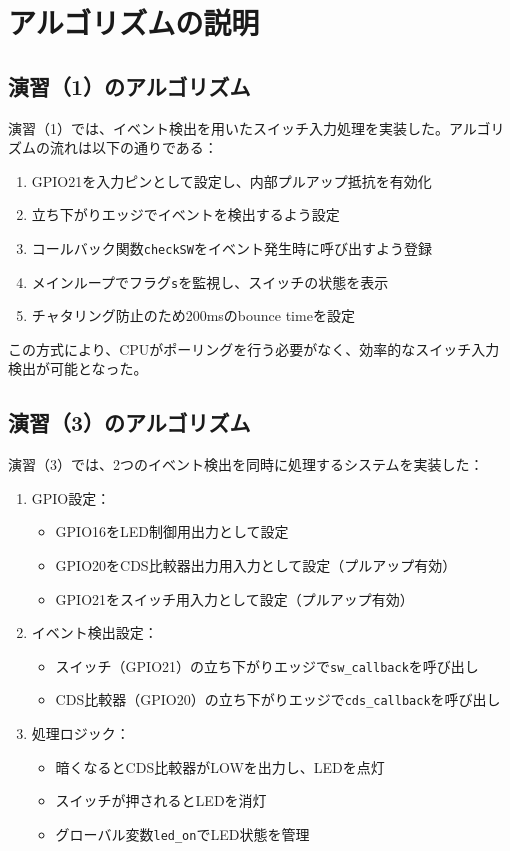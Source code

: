 \documentclass[a4paper,11pt,dvipdfmx]{jsarticle}
\begin{document}
\section{アルゴリズムの説明}
\subsection{演習（1）のアルゴリズム}
演習（1）では、イベント検出を用いたスイッチ入力処理を実装した。アルゴリズムの流れは以下の通りである：

\begin{enumerate}
\item GPIO21を入力ピンとして設定し、内部プルアップ抵抗を有効化
\item 立ち下がりエッジでイベントを検出するよう設定
\item コールバック関数\texttt{checkSW}をイベント発生時に呼び出すよう登録
\item メインループでフラグ\texttt{s}を監視し、スイッチの状態を表示
\item チャタリング防止のため200msのbounce timeを設定
\end{enumerate}

この方式により、CPUがポーリングを行う必要がなく、効率的なスイッチ入力検出が可能となった。

\subsection{演習（3）のアルゴリズム}
演習（3）では、2つのイベント検出を同時に処理するシステムを実装した：

\begin{enumerate}
\item GPIO設定：
   \begin{itemize}
   \item GPIO16をLED制御用出力として設定
   \item GPIO20をCDS比較器出力用入力として設定（プルアップ有効）
   \item GPIO21をスイッチ用入力として設定（プルアップ有効）
   \end{itemize}
\item イベント検出設定：
   \begin{itemize}
   \item スイッチ（GPIO21）の立ち下がりエッジで\texttt{sw\_callback}を呼び出し
   \item CDS比較器（GPIO20）の立ち下がりエッジで\texttt{cds\_callback}を呼び出し
   \end{itemize}
\item 処理ロジック：
   \begin{itemize}
   \item 暗くなるとCDS比較器がLOWを出力し、LEDを点灯
   \item スイッチが押されるとLEDを消灯
   \item グローバル変数\texttt{led\_on}でLED状態を管理
   \end{itemize}
\end{enumerate}
\end{document}
